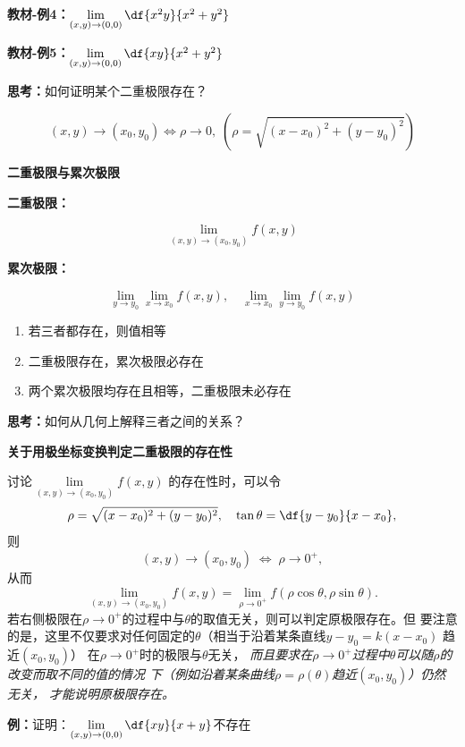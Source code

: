 {\bf 教材-例4：}$\lim\limits_{(x,y)\to(0,0)}\df{x^2y}{x^2+y^2}$

{\bf 教材-例5：}$\lim\limits_{(x,y)\to(0,0)}\df{xy}{x^2+y^2}$

{\bf 思考：}如何证明某个二重极限存在？

$$(x,y)\to(x_0,y_0)\Leftrightarrow\rho\to0,\;(\rho=\sqrt{(x-x_0)^2+(y-y_0)^2})$$

\begin{shaded}
	{\bf 二重极限与累次极限}
	
	{\bf 二重极限：}
	
	$$\lim\limits_{(x,y)\to(x_0,y_0)}f(x,y)$$
	
	{\bf 累次极限：}
	
	$$\lim\limits_{y\to y_0}\lim\limits_{x\to
	x_0}f(x,y),\quad \lim\limits_{x\to x_0}\lim\limits_{y\to y_0}f(x,y)$$
	
	\begin{enumerate}[(1)]
  	  \setlength{\itemindent}{1cm}
	  \item 若三者都存在，则值相等
	  \item 二重极限存在，累次极限必存在 
	  \item 两个累次极限均存在且相等，二重极限未必存在
	\end{enumerate}
	
	{\bf 思考：}如何从几何上解释三者之间的关系？
	
	\bigskip
	
	{\bf 关于用极坐标变换判定二重极限的存在性}
	
	讨论$\lim\limits_{(x,y)\to(x_0,y_0)}f(x,y)$
	的存在性时，可以令
	$$\rho=\sqrt{(x-x_0)^2+(y-y_0)^2},\quad \tan\theta=\df {y-y_0}{x-x_0},$$
	则
	$$(x,y)\to(x_0,y_0)\;\Leftrightarrow\;\rho\to0^+,$$
	从而
	$$\lim\limits_{(x,y)\to(x_0,y_0)}f(x,y)=\lim\limits_{\rho\to{0^+}}
	f(\rho\cos\theta,\rho\sin\theta).$$
	若右侧极限在$\rho\to{0^+}$的过程中与$\theta$的取值无关，则可以判定原极限存在。但
	要注意的是，这里不仅要求对任何固定的$\theta$（相当于沿着某条直线$y-y_0=k(x-x_0)$
	趋近$(x_0,y_0)$）	在$\rho\to{0^+}$时的极限与$\theta$无关，
	{\it 而且要求在$\rho\to{0^+}$过程中$\theta$可以随$\rho$的改变而取不同的值的情况
	下（例如沿着某条曲线$\rho=\rho(\theta)$趋近$(x_0,y_0)$）仍然无关，
	才能说明原极限存在。}
	
	{\bf 例：}证明：$\lim\limits_{(x,y)\to(0,0)}\df{xy}{x+y}$不存在
	

\end{shaded}
